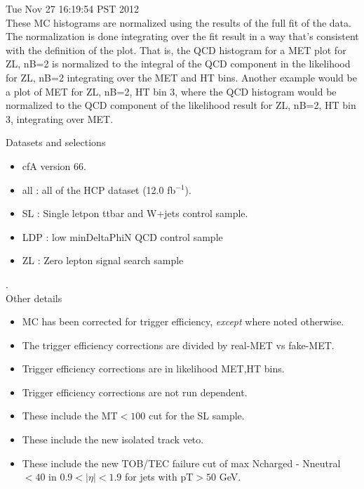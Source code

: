\documentclass[11pt]{article}
\begin{document}
  Tue Nov 27 16:19:54 PST 2012 \\


  These MC histograms are normalized using the results of the full fit of the data.
  The normalization is done integrating over the fit result in a way that's consistent
  with the definition of the plot.
  That is, the QCD histogram for a MET plot for ZL, nB=2 is normalized to the
  integral of the QCD component in the likelihood for ZL, nB=2 integrating
  over the MET and HT bins.
  Another example would be a plot of MET for ZL, nB=2, HT bin 3, where the
  QCD histogram would be normalized to the QCD component of the likelihood
  result for ZL, nB=2, HT bin 3, integrating over MET.

  \vspace{1cm}

   Datasets and selections
   \begin{itemize}
     \item cfA version 66.
     \item all : all of the HCP dataset (12.0 fb$^{-1}$).
     \item SL : Single letpon ttbar and W+jets control sample.
     \item LDP : low minDeltaPhiN QCD control sample
     \item ZL : Zero lepton signal search sample
   \end{itemize}

.\\

   Other details
   \begin{itemize}
     \item MC has been corrected for trigger efficiency, {\it except} where noted otherwise.
     \item  The trigger efficiency corrections are divided by real-MET vs fake-MET.
     \item Trigger efficiency corrections are in likelihood MET,HT bins.
     \item Trigger efficiency corrections are not run dependent.
     \item These include the MT$<100$ cut for the SL sample.
     \item These include the new isolated track veto.
     \item These include the new TOB/TEC failure cut of max Ncharged - Nneutral $<40$ in $0.9<|\eta|<1.9$ for
             jets with pT$>50$ GeV.
   \end{itemize}


  \pagebreak
  \clearpage
  \tableofcontents
  \clearpage
\end{document}
